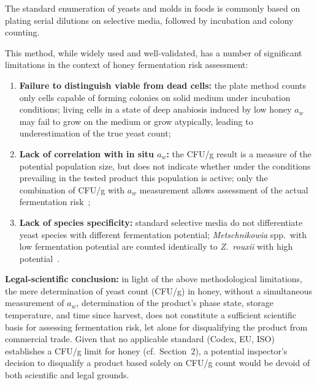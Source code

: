 
The standard enumeration of yeasts and molds in foods is commonly based on plating serial dilutions on selective media, followed by incubation and colony counting.


This method, while widely used and well-validated, has a number of significant
limitations in the context of honey fermentation risk assessment:


\begin{enumerate}
    \item \textbf{Failure to distinguish viable from dead cells:}
          the plate method counts only cells capable of forming
          colonies on solid medium under incubation conditions;
          living cells in a state of deep anabiosis induced by
          low honey $a_w$ may fail to grow on the medium or grow
          atypically, leading to underestimation of the true yeast
          count;
    \item \textbf{Lack of correlation with in situ $a_w$:} the
          CFU/g result is a measure of the potential population size,
          but does not indicate whether under the conditions prevailing
          in the tested product this population is active;
          only the combination of CFU/g with $a_w$ measurement allows
          assessment of the actual fermentation
          risk~\cite{ruegg1981};
    \item \textbf{Lack of species specificity:} standard selective
          media do not differentiate yeast species with different
          fermentation potential; \textit{Metschnikowia}
          spp.\ with low fermentation potential are counted
          identically to \textit{Z.~rouxii} with high
          potential~\cite{rodriguezmachado2024}.
\end{enumerate}

\textbf{Legal-scientific conclusion:} in light of the above
methodological limitations, the mere determination of yeast count
(CFU/g) in honey, without a simultaneous measurement of $a_w$,
determination of the product's phase state, storage temperature,
and time since harvest, does not constitute a sufficient scientific
basis for assessing fermentation risk, let alone for disqualifying
the product from commercial trade. Given that no applicable standard
(Codex, EU, ISO) establishes a CFU/g limit for honey
(cf.~Section~2), a potential inspector's decision to disqualify
a product based solely on CFU/g count would be devoid of both
scientific and legal grounds.


